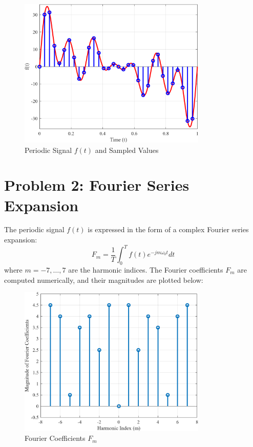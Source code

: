 \documentclass[12pt]{article}
\begin{document}
\begin{figure}[H]
    \centering
    \includegraphics[width=0.8\textwidth]{f_t.png}
    \caption{Periodic Signal $f(t)$ and Sampled Values}
\end{figure}

\newpage
\section*{Problem 2: Fourier Series Expansion}
The periodic signal $f(t)$ is expressed in the form of a complex Fourier series expansion:
\[ F_m = \frac{1}{T} \int_{0}^{T} f(t) e^{-j m \omega_0 t} dt \]
where $m = -7, \dots, 7$ are the harmonic indices. The Fourier coefficients $F_m$ are computed numerically, and their magnitudes are plotted below:

\begin{figure}[H]
    \centering
    \includegraphics[width=0.8\textwidth]{F_m.png}
    \caption{Fourier Coefficients $F_m$}
\end{figure}
\end{document}

